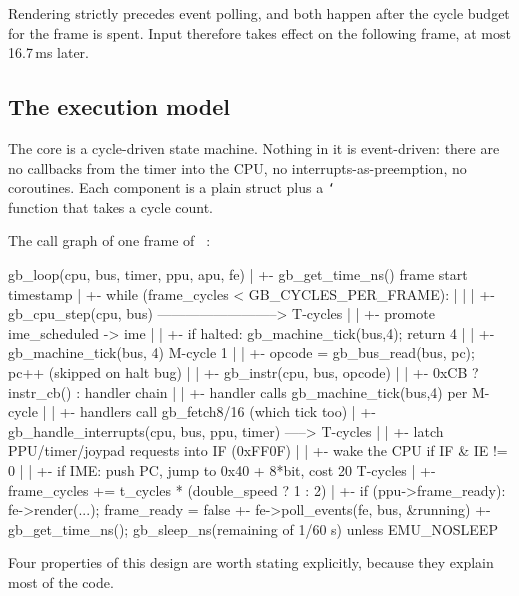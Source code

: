 \documentclass[twoside,a4paper]{refart}
\DeclareRobustCommand\cs[1]{\texttt{\char`\\\brk{#1}}}
\DeclareRobustCommand\fname[1]{%
  \texttt{\edef\gbemudetok{\detokenize{#1}}%
         \expandafter\seqsplit\expandafter{\gbemudetok}}}
\begin{document}
Rendering strictly precedes event polling, and both happen after the
cycle budget for the frame is spent.  Input therefore takes effect on the
following frame, at most 16.7\,ms later.

\subsection{The execution model}
\label{exec-model}

The core is a cycle-driven state machine.  Nothing in it is
event-driven: there are no callbacks from the timer into the CPU, no
interrupts-as-preemption, no coroutines.  Each component is a plain struct
plus a \cs{step} function that takes a cycle count.

The call graph of one frame of \fname{gb_loop}:

\begin{Code}
gb_loop(cpu, bus, timer, ppu, apu, fe)
 |
 +- gb_get_time_ns()                       frame start timestamp
 |
 +- while (frame_cycles < GB_CYCLES_PER_FRAME):
 |    |
 |    +- gb_cpu_step(cpu, bus)  --------------------------> T-cycles
 |    |     +- promote ime_scheduled -> ime
 |    |     +- if halted: gb_machine_tick(bus,4); return 4
 |    |     +- gb_machine_tick(bus, 4)                    M-cycle 1
 |    |     +- opcode = gb_bus_read(bus, pc); pc++       (skipped on halt bug)
 |    |     +- gb_instr(cpu, bus, opcode)
 |    |           +- 0xCB ? instr_cb() : handler chain
 |    |           +- handler calls gb_machine_tick(bus,4) per M-cycle
 |    |           +- handlers call gb_fetch8/16 (which tick too)
 |    +- gb_handle_interrupts(cpu, bus, ppu, timer) -----> T-cycles
 |    |     +- latch PPU/timer/joypad requests into IF (0xFF0F)
 |    |     +- wake the CPU if IF & IE != 0
 |    |     +- if IME: push PC, jump to 0x40 + 8*bit, cost 20 T-cycles
 |    +- frame_cycles += t_cycles * (double_speed ? 1 : 2)
 |
 +- if (ppu->frame_ready): fe->render(...); frame_ready = false
 +- fe->poll_events(fe, bus, &running)
 +- gb_get_time_ns(); gb_sleep_ns(remaining of 1/60 s) unless EMU_NOSLEEP
\end{Code}

Four properties of this design are worth stating explicitly, because they
explain most of the code.
\end{document}
